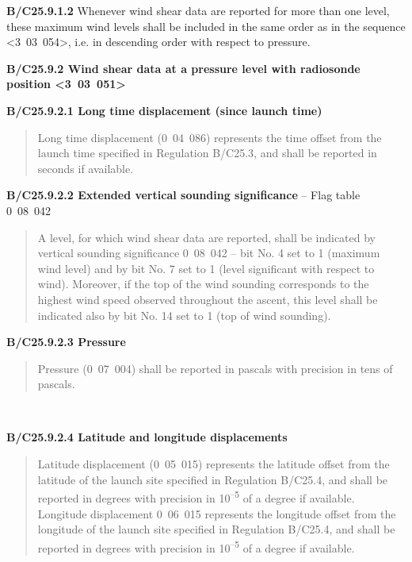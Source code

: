 \textbf{B/C25.9.1.2} Whenever wind shear data are reported for more than one level, these maximum wind levels shall be included in the same order as in the sequence \textless3~03~054\textgreater, i.e. in descending order with respect to pressure.

\textbf{B/C25.9.2 Wind shear data at a pressure level with radiosonde position \textless3~03~051\textgreater{}}

\textbf{B/C25.9.2.1 Long time displacement (since launch time)}

\begin{quote}
Long time displacement (0~04~086) represents the time offset from the launch time specified in Regulation B/C25.3, and shall be reported in seconds if available.
\end{quote}

\textbf{B/C25.9.2.2 Extended vertical sounding significance} -- Flag table 0~08~042

\begin{quote}
A level, for which wind shear data are reported, shall be indicated by vertical sounding significance 0~08~042 -- bit No. 4 set to 1 (maximum wind level) and by bit No. 7 set to 1 (level significant with respect to wind). Moreover, if the top of the wind sounding corresponds to the highest wind speed observed throughout the ascent, this level shall be indicated also by bit No. 14 set to 1 (top of wind sounding).
\end{quote}

\textbf{B/C25.9.2.3 Pressure}

\begin{quote}
Pressure (0~07~004) shall be reported in pascals with precision in tens of pascals.
\end{quote}

\textbf{\\
}

\textbf{B/C25.9.2.4 Latitude and longitude displacements}

\begin{quote}
Latitude displacement (0~05~015) represents the latitude offset from the latitude of the launch site specified in Regulation B/C25.4, and shall be reported in degrees with precision in 10\textsuperscript{--5} of a degree if available. Longitude displacement 0~06~015 represents the longitude offset from the longitude of the launch site specified in Regulation B/C25.4, and shall be reported in degrees with precision in 10\textsuperscript{--5} of a degree if available.
\end{quote}


